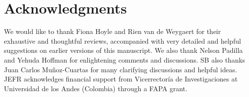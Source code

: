 \documentclass[a4,useAMS,usenatbib,usegraphicx]{mn2e}
\begin{document}
\section*{Acknowledgments}  


We would like to thank Fiona Hoyle and Rien van de Weygaert for their
exhaustive and thoughtful reviews, accompanied with very detailed and
helpful suggestions on earlier versions of this manuscript.  
We also thank Nelson Padilla and Yehuda Hoffman for enlightening
comments and discussions.
SB also thanks Juan Carlos Mu\~noz-Cuartas 
for many clarifying discussions and helpful ideas.
JEFR acknowledges financial support from Vicerrector\'ia de
Investigaciones at Universidad de los Andes (Colombia) through a FAPA
grant. 
\end{document}
